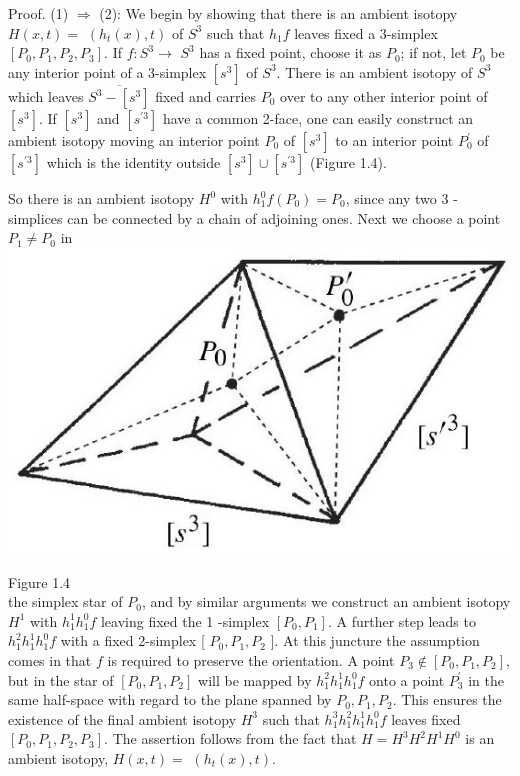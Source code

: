 \documentclass[10pt, letterpaper]{article}
\begin{document}
Proof. (1) $\Longrightarrow$ (2): We begin by showing that there is an ambient isotopy $H(x, t)=$ $\left(h_{t}(x), t\right)$ of $S^{3}$ such that $h_{1} f$ leaves fixed a 3-simplex $\left[P_{0}, P_{1}, P_{2}, P_{3}\right]$. If $f: S^{3} \rightarrow$ $S^{3}$ has a fixed point, choose it as $P_{0}$; if not, let $P_{0}$ be any interior point of a 3-simplex $\left[s^{3}\right]$ of $S^{3}$. There is an ambient isotopy of $S^{3}$ which leaves $\overline{S^{3}-\left[s^{3}\right]}$ fixed and carries $P_{0}$ over to any other interior point of $\left[s^{3}\right]$. If $\left[s^{3}\right]$ and $\left[s^{\prime 3}\right]$ have a common 2-face, one can easily construct an ambient isotopy moving an interior point $P_{0}$ of $\left[s^{3}\right]$ to an interior point $P_{0}^{\prime}$ of $\left[s^{\prime 3}\right]$ which is the identity outside $\left[s^{3}\right] \cup\left[s^{\prime 3}\right]$ (Figure 1.4).

So there is an ambient isotopy $H^{0}$ with $h_{1}^{0} f\left(P_{0}\right)=P_{0}$, since any two 3 -simplices can be connected by a chain of adjoining ones. Next we choose a point $P_{1} \neq P_{0}$ in\\
\includegraphics[scale=0.2, center]{2025_05_21_9c06be8de7a55410f8c1g-020}

Figure 1.4\\
the simplex star of $P_{0}$, and by similar arguments we construct an ambient isotopy $H^{1}$ with $h_{1}^{1} h_{1}^{0} f$ leaving fixed the 1 -simplex $\left[P_{0}, P_{1}\right]$. A further step leads to $h_{1}^{2} h_{1}^{1} h_{1}^{0} f$ with a fixed 2-simplex [ $P_{0}, P_{1}, P_{2}$ ]. At this juncture the assumption comes in that $f$ is required to preserve the orientation. A point $P_{3} \notin\left[P_{0}, P_{1}, P_{2}\right]$, but in the star of $\left[P_{0}, P_{1}, P_{2}\right]$ will be mapped by $h_{1}^{2} h_{1}^{1} h_{1}^{0} f$ onto a point $P_{3}^{\prime}$ in the same half-space with regard to the plane spanned by $P_{0}, P_{1}, P_{2}$. This ensures the existence of the final ambient isotopy $H^{3}$ such that $h_{1}^{3} h_{1}^{2} h_{1}^{1} h_{1}^{0} f$ leaves fixed $\left[P_{0}, P_{1}, P_{2}, P_{3}\right]$. The assertion follows from the fact that $H=H^{3} H^{2} H^{1} H^{0}$ is an ambient isotopy, $H(x, t)=$ $\left(h_{t}(x), t\right)$.
\end{document}
